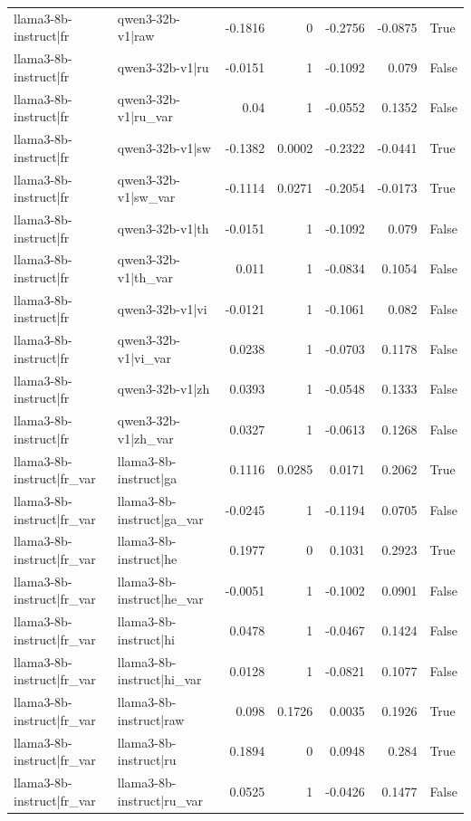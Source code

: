\begin{table}
\begin{tabular}{l l r r r r l}
llama3-8b-instruct|fr & qwen3-32b-v1|raw & -0.1816 & 0 & -0.2756 & -0.0875 & True \\
llama3-8b-instruct|fr & qwen3-32b-v1|ru & -0.0151 & 1 & -0.1092 & 0.079 & False \\
llama3-8b-instruct|fr & qwen3-32b-v1|ru_var & 0.04 & 1 & -0.0552 & 0.1352 & False \\
llama3-8b-instruct|fr & qwen3-32b-v1|sw & -0.1382 & 0.0002 & -0.2322 & -0.0441 & True \\
llama3-8b-instruct|fr & qwen3-32b-v1|sw_var & -0.1114 & 0.0271 & -0.2054 & -0.0173 & True \\
llama3-8b-instruct|fr & qwen3-32b-v1|th & -0.0151 & 1 & -0.1092 & 0.079 & False \\
llama3-8b-instruct|fr & qwen3-32b-v1|th_var & 0.011 & 1 & -0.0834 & 0.1054 & False \\
llama3-8b-instruct|fr & qwen3-32b-v1|vi & -0.0121 & 1 & -0.1061 & 0.082 & False \\
llama3-8b-instruct|fr & qwen3-32b-v1|vi_var & 0.0238 & 1 & -0.0703 & 0.1178 & False \\
llama3-8b-instruct|fr & qwen3-32b-v1|zh & 0.0393 & 1 & -0.0548 & 0.1333 & False \\
llama3-8b-instruct|fr & qwen3-32b-v1|zh_var & 0.0327 & 1 & -0.0613 & 0.1268 & False \\
llama3-8b-instruct|fr_var & llama3-8b-instruct|ga & 0.1116 & 0.0285 & 0.0171 & 0.2062 & True \\
llama3-8b-instruct|fr_var & llama3-8b-instruct|ga_var & -0.0245 & 1 & -0.1194 & 0.0705 & False \\
llama3-8b-instruct|fr_var & llama3-8b-instruct|he & 0.1977 & 0 & 0.1031 & 0.2923 & True \\
llama3-8b-instruct|fr_var & llama3-8b-instruct|he_var & -0.0051 & 1 & -0.1002 & 0.0901 & False \\
llama3-8b-instruct|fr_var & llama3-8b-instruct|hi & 0.0478 & 1 & -0.0467 & 0.1424 & False \\
llama3-8b-instruct|fr_var & llama3-8b-instruct|hi_var & 0.0128 & 1 & -0.0821 & 0.1077 & False \\
llama3-8b-instruct|fr_var & llama3-8b-instruct|raw & 0.098 & 0.1726 & 0.0035 & 0.1926 & True \\
llama3-8b-instruct|fr_var & llama3-8b-instruct|ru & 0.1894 & 0 & 0.0948 & 0.284 & True \\
llama3-8b-instruct|fr_var & llama3-8b-instruct|ru_var & 0.0525 & 1 & -0.0426 & 0.1477 & False \\

\end{tabular}
\end{table}
